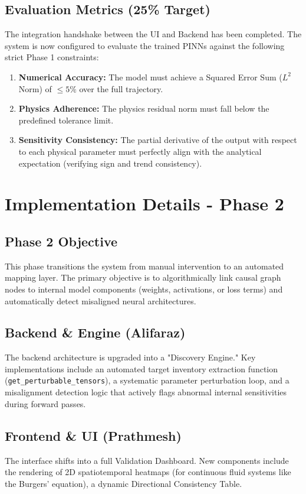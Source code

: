 \documentclass[12pt,singleside,a4paper]{article}
\begin{document}
\subsection{Evaluation Metrics (25\% Target)}
The integration handshake between the UI and Backend has been completed. The system is now configured to evaluate the trained PINNs against the following strict Phase 1 constraints:
\begin{enumerate}
    \item \textbf{Numerical Accuracy:} The model must achieve a Squared Error Sum ($L^2$ Norm) of $\le 5\%$ over the full trajectory.
    \item \textbf{Physics Adherence:} The physics residual norm must fall below the predefined tolerance limit.
    \item \textbf{Sensitivity Consistency:} The partial derivative of the output with respect to each physical parameter must perfectly align with the analytical expectation (verifying sign and trend consistency).
\end{enumerate}

\section{Implementation Details - Phase 2}

\subsection{Phase 2 Objective}
This phase transitions the system from manual intervention to an automated mapping layer. The primary objective is to algorithmically link causal graph nodes to internal model components (weights, activations, or loss terms) and automatically detect misaligned neural architectures.

\subsection{Backend \& Engine (Alifaraz)}
The backend architecture is upgraded into a "Discovery Engine." Key implementations include an automated target inventory extraction function (\texttt{get\_perturbable\_tensors}), a systematic parameter perturbation loop, and a misalignment detection logic that actively flags abnormal internal sensitivities during forward passes.

\subsection{Frontend \& UI (Prathmesh)}
The interface shifts into a full Validation Dashboard. New components include the rendering of 2D spatiotemporal heatmaps (for continuous fluid systems like the Burgers' equation), a dynamic Directional Consistency Table.
\end{document}
